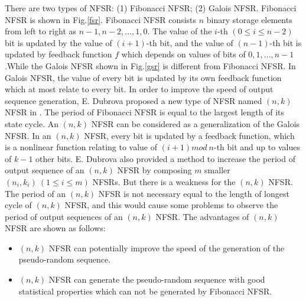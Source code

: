 \documentclass[conference]{IEEEtran}
\begin{document}
There are two types of NFSR: (1) Fibonacci NFSR; (2) Galois NFSR. Fibonacci NFSR is shown in Fig.\ref{fsr}. Fibonacci NFSR consists $n$ binary storage elements from left to right as $n-1,n-2,...,1,0$. The value of the $i$-th $(0\leq i\leq n-2)$ bit is updated by the value of $(i+1)$-th bit, and the value of $(n-1)$-th bit is updated by feedback function $f$ which depends on values of bits of $0,1,...,n-1$.While the Galois NFSR shown in Fig.\ref{gsr} is different from Fibonacci NFSR. In Galois NFSR, the value of every bit is updated by its own feedback function which at most relate to every bit. In order to improve the speed of output sequence generation, E. Dubrova proposed a new type of NFSR named $(n,k)$ NFSR in \cite{Dubrova2008On}. The period of Fibonacci NFSR is equal to the largest length of its state cycle. An $(n,k)$ NFSR can be considered as a generalization of the Galois NFSR. In an $(n,k)$ NFSR, every bit is updated by a feedback function, which is a nonlinear function relating to value of $(i+1)mod~n$-th bit and up to values of $k-1$ other bits. E. Dubrova also provided a method to increase the period of output sequence of an $(n,k)$ NFSR by composing $m$ smaller $(n_i,k_i)~(1\leq i\leq m)$ NFSRs. But there is a weakness for the $(n,k)$ NFSR. The period of an $(n,k)$ NFSR is not necessary equal to the length of longest cycle of $(n,k)$ NFSR, and this would cause some problems to observe the period of output sequences of an $(n,k)$ NFSR. The advantages of $(n,k)$ NFSR are shown as follows:
\begin{itemize}
  \item $(n,k)$ NFSR can potentially improve the speed of the generation of the pseudo-random sequence.
  \item $(n,k)$ NFSR can generate the pseudo-random sequence with good statistical properties which can not be generated by Fibonacci NFSR.
\end{itemize}
\end{document}
